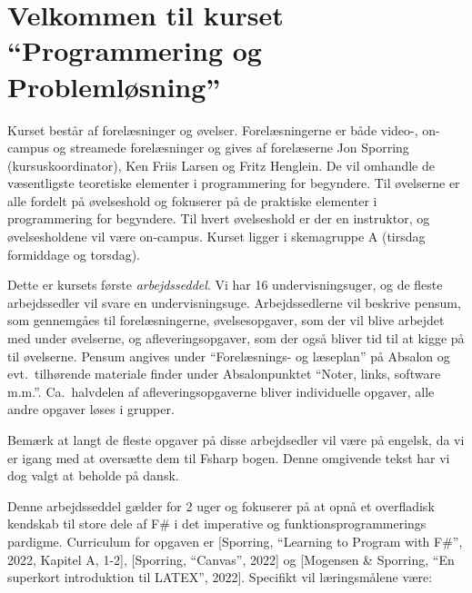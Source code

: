 \documentclass[a4paper,12pt]{article}
\newcommand{\typeLetter}{i}
\begin{document}
\maketitle
\section*{Velkommen til kurset ``Programmering og Problemløsning''}
Kurset består af forelæsninger og øvelser. Forelæsningerne er både video-, on-campus og streamede forelæsninger og gives af forelæserne Jon Sporring (kursuskoordinator), Ken Friis Larsen og Fritz Henglein. De vil omhandle de væsentligste teoretiske elementer i programmering for begyndere. Til øvelserne er alle fordelt på øvelseshold og fokuserer på de praktiske elementer i programmering for begyndere. Til hvert øvelseshold er der en instruktor, og øvelsesholdene vil være on-campus. Kurset ligger i skemagruppe A (tirsdag formiddage og torsdag).

Dette er kursets første \emph{arbejdsseddel}. Vi har 16 undervisningsuger, og de fleste arbejdssedler vil svare en undervisningsuge.  Arbejdssedlerne vil beskrive pensum, som gennemgåes til forelæsningerne, øvelsesopgaver, som der vil blive arbejdet med under øvelserne, og afleveringsopgaver, som der også bliver tid til at kigge på til øvelserne. Pensum angives under ``Forelæsnings- og læseplan'' på Absalon og evt.\ tilhørende materiale finder under Absalonpunktet ``Noter, links, software m.m.''. Ca.\ halvdelen af afleveringsopgaverne bliver individuelle opgaver, alle andre opgaver løses i grupper.

Bemærk at langt de fleste opgaver på disse arbejdsedler vil være på engelsk, da vi er igang med at oversætte dem til Fsharp bogen. Denne omgivende tekst har vi dog valgt at beholde på dansk.

Denne arbejdsseddel gælder for 2 uger og fokuserer på at opnå et overfladisk kendskab til store dele af F\# i det imperative og funktionsprogrammerings pardigme. Curriculum for opgaven er [Sporring, ``Learning to Program with F\#'', 2022, Kapitel A, 1-2], [Sporring, ``Canvas'', 2022] og [Mogensen \& Sporring, ``En superkort introduktion til LATEX'', 2022]. Specifikt vil læringsmålene være:

\learningConditionsTxt{\typeLetter}

\end{document}
